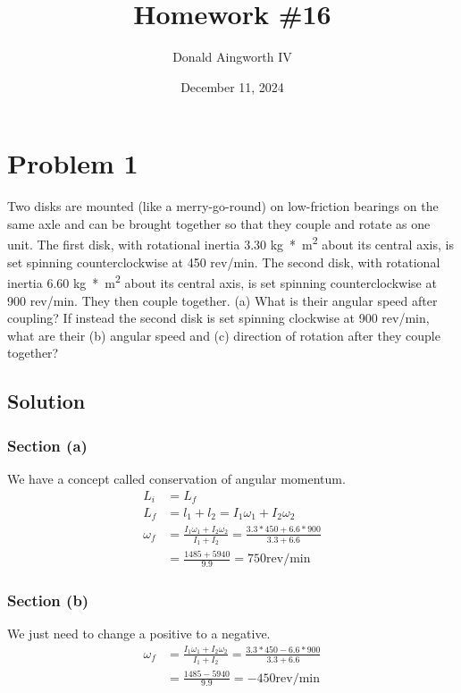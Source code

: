 \documentclass[12pt]{article}
\title{Homework \#16}
\author{Donald Aingworth IV}
\date{December 11, 2024}
\begin{document}

\maketitle

\pagebreak
\section{Problem 1}
Two disks are mounted (like a merry-go-round) on low-friction bearings on the same axle and can be brought together so that they couple and rotate as one unit. The first disk, with rotational inertia 3.30 \unit{\kilo\gram*\meter^2} about its central axis, is set spinning counterclockwise at 450 rev/min. The second disk, with rotational inertia 6.60 \unit{\kilo\gram*\meter^2} about its central axis, is set spinning counterclockwise at 900 rev/min. They then couple together. (a) What is their angular speed after coupling? If instead the second disk is set spinning clockwise at 900 rev/min, what are their (b) angular speed and (c) direction of rotation after they couple together?

\subsection{Solution}
\subsubsection{Section (a)}
We have a concept called conservation of angular momentum. 
\begin{align}
    L_i &=  L_f\\
    L_f &=  l_1 + l_2
        =   I_1\omega_1 + I_2\omega_2\\
    \omega_f    &=  \frac{I_1\omega_1 + I_2\omega_2}{I_1 + I_2}
        =   \frac{3.3*450 + 6.6*900}{3.3 + 6.6}\\
        &=  \frac{1485 + 5940}{9.9}
        =   \boxed{750\text{rev/min}}
\end{align}

\subsubsection{Section (b)}
We just need to change a positive to a negative. 
\begin{align}
    \omega_f    &=  \frac{I_1\omega_1 + I_2\omega_2}{I_1 + I_2}
        =   \frac{3.3*450 - 6.6*900}{3.3 + 6.6}\\
        &=  \frac{1485 - 5940}{9.9}
        =   \boxed{-450\text{rev/min}}
\end{align}
\end{document}

